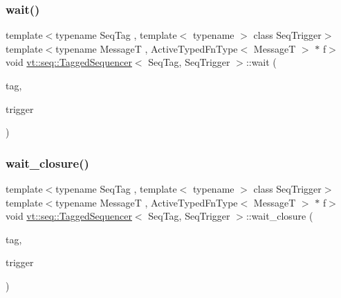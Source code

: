\mbox{\label{structvt_1_1seq_1_1_tagged_sequencer_a8c96cc7cc925cfd95b0e90d5e29b2211}} 
\subsubsection{\texorpdfstring{wait()}{wait()}\hspace{0.1cm}{\footnotesize\ttfamily [2/2]}}
{\footnotesize\ttfamily template$<$typename Seq\+Tag , template$<$ typename $>$ class Seq\+Trigger$>$ \\
template$<$typename MessageT , Active\+Typed\+Fn\+Type$<$ Message\+T $>$ $\ast$ f$>$ \\
void \hyperlink{structvt_1_1seq_1_1_tagged_sequencer}{vt\+::seq\+::\+Tagged\+Sequencer}$<$ Seq\+Tag, Seq\+Trigger $>$\+::wait (\begin{DoxyParamCaption}\item[{\hyperlink{namespacevt_a84ab281dae04a52a4b243d6bf62d0e52}{Tag\+Type} const \&}]{tag,  }\item[{\hyperlink{structvt_1_1seq_1_1_tagged_sequencer_a4b015f2f7d3197a66af5576f0e63a834}{Seq\+Trigger\+Type}$<$ MessageT $>$}]{trigger }\end{DoxyParamCaption})}

\mbox{\label{structvt_1_1seq_1_1_tagged_sequencer_a54b83e9239a17a4fd75f8c2c9ac59cee}} 
\subsubsection{\texorpdfstring{wait\+\_\+closure()}{wait\_closure()}\hspace{0.1cm}{\footnotesize\ttfamily [1/2]}}
{\footnotesize\ttfamily template$<$typename Seq\+Tag , template$<$ typename $>$ class Seq\+Trigger$>$ \\
template$<$typename MessageT , Active\+Typed\+Fn\+Type$<$ Message\+T $>$ $\ast$ f$>$ \\
void \hyperlink{structvt_1_1seq_1_1_tagged_sequencer}{vt\+::seq\+::\+Tagged\+Sequencer}$<$ Seq\+Tag, Seq\+Trigger $>$\+::wait\+\_\+closure (\begin{DoxyParamCaption}\item[{\hyperlink{namespacevt_a84ab281dae04a52a4b243d6bf62d0e52}{Tag\+Type} const \&}]{tag,  }\item[{\hyperlink{namespacevt_1_1seq_aa88b0d93284d188be39704024ab58b8f}{Seq\+Non\+Migratable\+Trigger\+Type}$<$ MessageT $>$}]{trigger }\end{DoxyParamCaption})}

